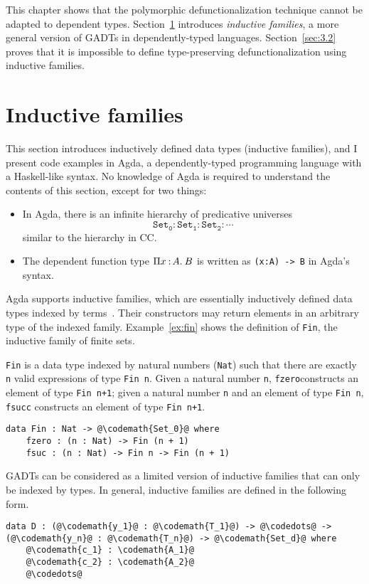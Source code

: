 
This chapter shows that the polymorphic defunctionalization technique cannot be adapted to dependent types. Section~\ref{sec:3.1} introduces \textit{inductive families}, a more general version of GADTs in dependently-typed languages. Section~\ref{sec:3.2} proves that it is impossible to define type-preserving defunctionalization using inductive families.

\section{Inductive families}
\label{sec:3.1}

This section introduces inductively defined data types (inductive families), and I present code examples in Agda, a dependently-typed programming language with a Haskell-like syntax. No knowledge of Agda is required to understand the contents of this section, except for two things:
\begin{itemize}
  \item In Agda, there is an infinite hierarchy of predicative universes \[ \mathtt{Set_0 : Set_1 : Set_2 : \cdots} \] similar to the hierarchy in CC.
  \item The dependent function type $\Pi x\mkern1.5mu{\hspace{0.5mm}{:}\hspace{0.5mm}} A.\hspace{0.8mm}B$ is written as \texttt{(x:A) -> B} in Agda's syntax.
\end{itemize}

Agda supports inductive families, which are essentially inductively defined data types indexed by terms~\cite{AgdaDoc}. Their constructors may return elements in an arbitrary type of the indexed family. Example~\ref{ex:fin} shows the definition of \texttt{Fin}, the inductive family of finite sets.

\begin{exmp} \texttt{Fin} is a data type indexed by natural numbers (\texttt{Nat}) such that there are exactly \texttt{n} valid expressions of type \texttt{Fin n}. Given a natural number \texttt{n}, \texttt{fzero}constructs an element of type \texttt{Fin n+1}; given a natural number \texttt{n} and an element of type \texttt{Fin n}, \texttt{fsucc} constructs an element of type \texttt{Fin n+1}.
\begin{lstlisting}[escapechar=@]
data Fin : Nat -> @\codemath{Set_0}@ where
    fzero : (n : Nat) -> Fin (n + 1)
    fsuc : (n : Nat) -> Fin n -> Fin (n + 1)
\end{lstlisting}
\label{ex:fin}
\end{exmp}
GADTs can be considered as a limited version of inductive families that can only be indexed by types. In general, inductive families are defined in the following form.
\begin{lstlisting}[escapechar=@]
data D : (@\codemath{y_1}@ : @\codemath{T_1}@) -> @\codedots@ -> (@\codemath{y_n}@ : @\codemath{T_n}@) -> @\codemath{Set_d}@ where
    @\codemath{c_1} : \codemath{A_1}@
    @\codemath{c_2} : \codemath{A_2}@
    @\codedots@ 
\end{lstlisting}

